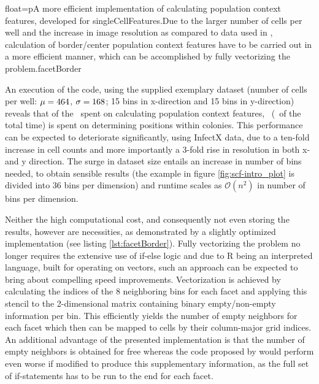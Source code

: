 \begin{rlisting}{float=p}{A more efficient implementation of calculating population context features, developed for singleCellFeatures.}{Due to the larger number of cells per well and the increase in image resolution as compared to data used in \cite{Knapp2011}, calculation of border/center population context features have to be carried out in a more efficient manner, which can be accomplished by fully vectorizing the problem.}{facetBorder}

\end{rlisting}


An execution of the code, using the supplied exemplary dataset (number of cells per well: $\mu=464$, $\sigma=168$; 15 bins in x-direction and 15 bins in y-direction) reveals that of the \knitrScfRnaicellTotal\ spent on calculating population context features, \knitrScfRnaicellEdgepos\ (\knitrScfRnaicellPercentage\ of the total time) is spent on determining positions within colonies. This performance can be expected to deteriorate significantly, using InfectX data, due to a ten-fold increase in cell counts and more importantly a 3-fold rise in resolution in both x- and y direction. The surge in dataset size entails an increase in number of bins needed, to obtain sensible results (the example in figure \ref{fig:scf-intro_plot} is divided into 36 bins per dimension) and runtime scales as $\mathcal{O}(n^2)$ in number of bins per dimension.

Neither the high computational cost, and consequently not even storing the results, however are necessities, as demonstrated by a slightly optimized implementation (see listing \ref{lst:facetBorder}). Fully vectorizing the problem no longer requires the extensive use of if-else logic and due to R being an interpreted language, built for operating on vectors, such an approach can be expected to bring about compelling speed improvements. Vectorization is achieved by calculating the indices of the 8 neighboring bins for each facet and applying this stencil to the 2-dimensional matrix containing binary empty/non-empty information per bin. This efficiently yields the number of empty neighbors for each facet which then can be mapped to cells by their column-major grid indices. An additional advantage of the presented implementation is that the number of empty neighbors is obtained for free whereas the code proposed by \citeauthor{Knapp2011} would perform even worse if modified to produce this supplementary information, as the full set of if-statements has to be run to the end for each facet.

